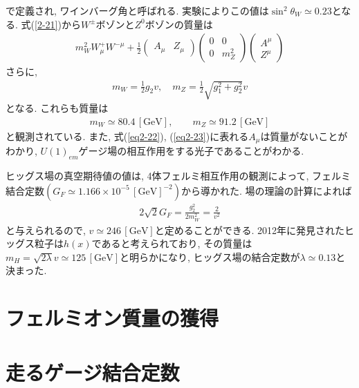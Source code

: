 で定義され, ワインバーグ角と呼ばれる.
実験によりこの値は$\sin^2\theta_W \simeq 0.23$となる.
式(\ref{2-21})から$W^\pm$ボゾンと$Z^0$ボゾンの質量は
\begin{align}
  m_W^2 W_\mu^+W^{-\mu} + \frac{1}{2}\left(\begin{array}{cc}
      A_\mu & Z_\mu
    \end{array}\right) \left(\begin{array}{cc}
      0 & 0 \\
      0 & m_Z^2 
      \end{array}\right)\left(\begin{array}{c}
      A^\mu \\
      Z^\mu
  \end{array}\right)\label{eq2-23}
\end{align}
さらに,
\begin{align}
  m_W = \frac{1}{2}g_2v,\quad m_Z = \frac{1}{2}\sqrt{g_1^2+g_2^2}v\nonumber
\end{align}
となる.
これらも質量は
\begin{align}
  m_W \simeq 80.4\,\mathrm{[GeV]},\qquad m_Z \simeq 91.2\,\mathrm{[GeV]} \nonumber
\end{align}
と観測されている.
また, 式(\ref{eq2-22}), (\ref{eq2-23})に表れる$A_\mu$は質量がないことがわかり, $U(1)_{em}$ゲージ場の相互作用をする光子であることがわかる.

ヒッグス場の真空期待値の値は, 4体フェルミ相互作用の観測によって, フェルミ結合定数$(G_F\simeq 1.166\times 10^{-5}\,\mathrm{[GeV]}^{-2})$から導かれた.
場の理論の計算によれば
\begin{align}
  2\sqrt{2}G_F = \frac{g_2^2}{2m_W^2} = \frac{2}{v^2}\nonumber
\end{align}
と与えられるので, $v \simeq 246\,\mathrm{[GeV]}$と定めることができる.
2012年に発見されたヒッグス粒子は$h(x)$であると考えられており, その質量は$m_H = \sqrt{2\lambda}v \simeq 125\,\mathrm{[GeV]}$と明らかになり, ヒッグス場の結合定数が$\lambda \simeq 0.13$と決まった.
\section{フェルミオン質量の獲得}
\section{走るゲージ結合定数}


